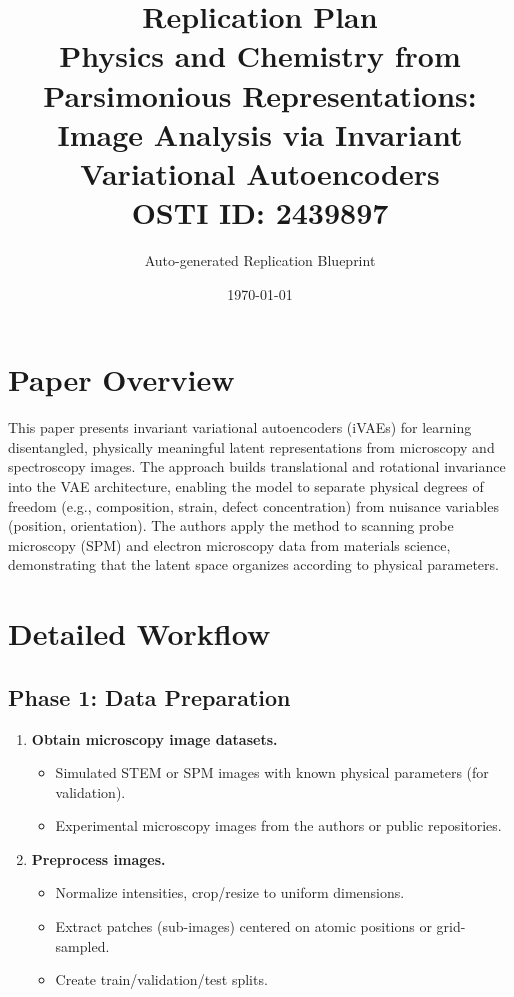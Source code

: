 \documentclass[11pt,a4paper]{article}
\title{\textbf{Replication Plan}\\[0.5em]
\large Physics and Chemistry from Parsimonious Representations: Image Analysis via Invariant Variational Autoencoders\\[0.3em]
\normalsize OSTI ID: 2439897}
\author{Auto-generated Replication Blueprint}
\date{\today}
\begin{document}
\maketitle
\tableofcontents
\newpage

\section{Paper Overview}
This paper presents invariant variational autoencoders (iVAEs) for learning disentangled, physically meaningful latent representations from microscopy and spectroscopy images. The approach builds translational and rotational invariance into the VAE architecture, enabling the model to separate physical degrees of freedom (e.g., composition, strain, defect concentration) from nuisance variables (position, orientation). The authors apply the method to scanning probe microscopy (SPM) and electron microscopy data from materials science, demonstrating that the latent space organizes according to physical parameters.

\section{Detailed Workflow}

\subsection{Phase 1: Data Preparation}
\begin{enumerate}[label=\textbf{1.\arabic*}]
  \item \textbf{Obtain microscopy image datasets.}
    \begin{itemize}
      \item Simulated STEM or SPM images with known physical parameters (for validation).
      \item Experimental microscopy images from the authors or public repositories.
    \end{itemize}
  \item \textbf{Preprocess images.}
    \begin{itemize}
      \item Normalize intensities, crop/resize to uniform dimensions.
      \item Extract patches (sub-images) centered on atomic positions or grid-sampled.
      \item Create train/validation/test splits.
    \end{itemize}
\end{enumerate}
\end{document}
